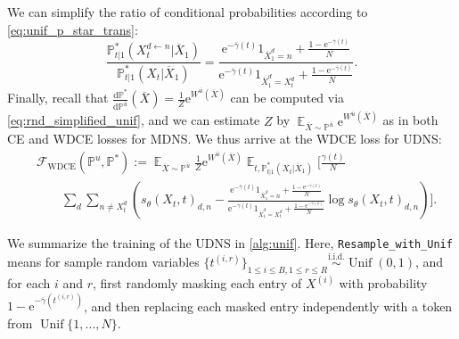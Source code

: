 \documentclass{article}
\theoremstyle{remark}
\newcommand{\ro}[1]{\left(#1\right)} %
\newcommand{\e}{\mathrm{e}}
\renewcommand{\P}{\mathbb{P}}
\newcommand{\E}{\operatorname{\mathbb{E}}}
\newcommand{\iid}{\stackrel{\mathrm{i.i.d.}}{\sim}}
\newcommand{\unif}{\operatorname{Unif}}
\newcommand{\de}[2]{\frac{\mathrm{d}#1}{\mathrm{d}#2}} %
\newcommand{\cF}{\mathcal{F}}
\newcommand{\ub}{{\bar{u}}}
\newcommand{\gammab}{{\overline{\gamma}}}
\newcommand{\Xb}{\overline{X}}
\begin{document}
We can simplify the ratio of conditional probabilities according to \cref{eq:unif_p_star_trans}:
$$\frac{\P^*_{t|1}(X_t^{d\gets n}|\Xb_1)}{\P^*_{t|1}(X_t|\Xb_1)}=\frac{\e^{-\gammab(t)}1_{\Xb_1^d=n}+\frac{1-\e^{-\gammab(t)}}{N}}{\e^{-\gammab(t)}1_{\Xb_1^d=X_t^d}+\frac{1-\e^{-\gammab(t)}}{N}}.$$
Finally, recall that $\de{\P^*}{\P^\ub}(\Xb)=\frac{1}{Z}\e^{W^\ub(\Xb)}$ can be computed via \cref{eq:rnd_simplified_unif}, and we can estimate $Z$ by $\E_{\Xb\sim\P^\ub}\e^{W^\ub(\Xb)}$ as in both CE and WDCE losses for MDNS. We thus arrive at the WDCE loss for UDNS:
\begin{equation}
\begin{aligned}
    &\cF_\mathrm{WDCE}(\P^u,\P^*):=\E_{\Xb\sim\P^\ub}\frac1Z\e^{W^\ub(\Xb)}\E_{t,\P^*_{t|1}(X_t|\Xb_1)}\Bigg[\frac{\gamma(t)}{N}\\
    &\qquad \sum_{d}\sum_{n\ne X_t^d}\ro{s_\theta(X_t,t)_{d,n}-\frac{\e^{-\gammab(t)}1_{\Xb_1^d=n}+\frac{1-\e^{-\gammab(t)}}{N}}{\e^{-\gammab(t)}1_{\Xb_1^d=X_t^d}+\frac{1-\e^{-\gammab(t)}}{N}}\log s_\theta(X_t,t)_{d,n}}\Bigg].
\end{aligned}
\label{eq:obj_wdce_unif}
\end{equation}

We summarize the training of the UDNS in \cref{alg:unif}. Here, \texttt{Resample\_with\_Unif} means for sample random variables $\{t^{(i,r)}\}_{1\le i\le B,1\le r\le R}\iid\unif(0,1)$, and for each $i$ and $r$, first randomly masking each entry of $X^{(i)}$ with probability $1-\e^{-\gammab(t^{(i,r)})}$, and then replacing each masked entry independently with a token from $\unif\{1,...,N\}$. 
\end{document}
